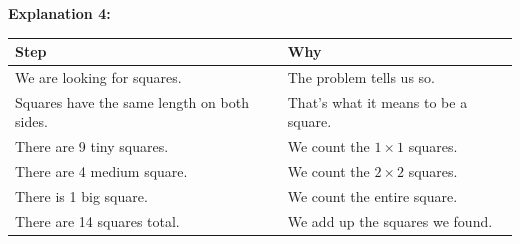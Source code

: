 \documentclass[noauthor,nooutcomes]{ximera}
\begin{document}
\begin{mdframed}
{\bf Explanation 4:}

\begin{tabularx}{\textwidth}{X|X}
    Step & Why  \\ \hline \hline
    We are looking for squares. & The problem tells us so. \\ \hline
    Squares have the same length on both sides. & That's what it means to be a square. \\ \hline
    There are 9 tiny squares. & We count the $1\times 1$ squares. \\ \hline
    There are 4 medium square. & We count the $2 \times 2$ squares. \\ \hline
    There is 1 big square. & We count the entire square. \\ \hline
    There are 14 squares total. & We add up the squares we found. \\
\end{tabularx}
\end{mdframed}




\newpage
\end{document}
